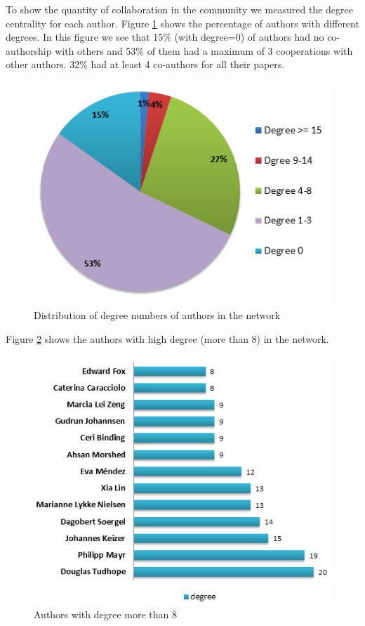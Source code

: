 \documentclass[runningheads,a4paper]{llncs}
\begin{document}
To show the quantity of collaboration in the community we measured the degree centrality for each author. Figure \ref{fig:degreePercentage} shows the percentage of authors with different degrees. In this figure we see that 15\% (with degree=0) of authors had no co-authorship with others and 53\% of them had a maximum of 3 cooperations with other authors. 32\% had at least 4 co-authors for all their papers.


\begin{figure}
	\centering
	\includegraphics[width=0.6\linewidth]{degreePercentage}
	\caption{Distribution of degree numbers of authors in the network} 
	\label{fig:degreePercentage}
\end{figure}

Figure \ref{fig:degree16} shows the authors with high degree (more than 8) in the network. 

\begin{figure}
	\centering
	\includegraphics[width=0.8\linewidth]{degree16}
	\caption{Authors with degree more than 8}
	\label{fig:degree16}
\end{figure}
\end{document}

